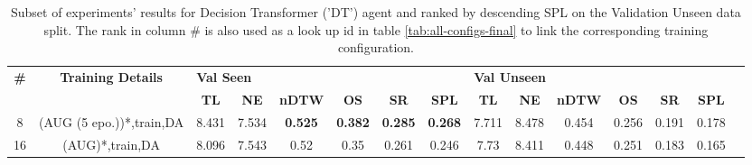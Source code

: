 \begin{table}
\centering
\caption{\label{tab:dt_dagger_envdrop}Subset of experiments' results for Decision Transformer ('DT') agent and ranked by descending SPL on the Validation Unseen data split. The rank in column \# is also used as a look up id in table \ref{tab:all-configs-final} to link the corresponding training configuration.}
\begin{tabular}{@{\hskip3pt}c@{\hskip3pt}c@{\hskip3pt}c@{\hskip3pt}c@{\hskip3pt}c@{\hskip3pt}c@{\hskip3pt}c@{\hskip3pt}c@{\hskip3pt}c@{\hskip3pt}c@{\hskip3pt}c@{\hskip3pt}c@{\hskip3pt}c@{\hskip3pt}c@{\hskip3pt}c}
\toprule
\textbf{\#} & \textbf{Training Details} & \multicolumn{6}{l}{\textbf{Val Seen}} & \multicolumn{6}{l}{\textbf{Val Unseen}} \\
 \textbf{~} &                \textbf{~} &       \textbf{TL} & \textbf{NE} &   \textbf{nDTW} &     \textbf{OS} &     \textbf{SR} &    \textbf{SPL} &         \textbf{TL} & \textbf{NE} & \textbf{nDTW} & \textbf{OS} & \textbf{SR} & \textbf{SPL} \\
\midrule
          8 &  (AUG (5 epo.))*,train,DA &             8.431 &       7.534 &  \textbf{0.525} &  \textbf{0.382} &  \textbf{0.285} &  \textbf{0.268} &               7.711 &       8.478 &         0.454 &       0.256 &       0.191 &        0.178 \\
         16 &           (AUG)*,train,DA &             8.096 &       7.543 &            0.52 &            0.35 &           0.261 &           0.246 &                7.73 &       8.411 &         0.448 &       0.251 &       0.183 &        0.165 \\
\bottomrule
\end{tabular}
\end{table}
